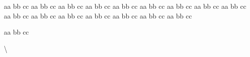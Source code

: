 \documentclass{article}
\begin{document}
aa bb cc aa bb cc aa bb cc aa bb cc aa bb cc aa bb cc aa bb cc aa bb cc aa bb cc aa bb cc aa bb cc aa bb cc aa bb cc aa bb cc aa bb cc aa bb cc

aa    bb    cc

\textbackslash
\end{document}
